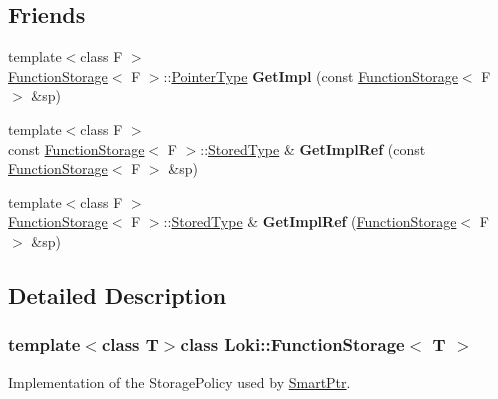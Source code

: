 \subsection*{Friends}
\begin{DoxyCompactItemize}
\item 
\hypertarget{classLoki_1_1FunctionStorage_a3dc5859035d88a940d9aac1499f40f16}{}{\footnotesize template$<$class F $>$ }\\\hyperlink{classLoki_1_1FunctionStorage}{Function\+Storage}$<$ F $>$\+::\hyperlink{classLoki_1_1FunctionStorage_a0e56f22b839615e3082416ca4025ca69}{Pointer\+Type} {\bfseries Get\+Impl} (const \hyperlink{classLoki_1_1FunctionStorage}{Function\+Storage}$<$ F $>$ \&sp)\label{classLoki_1_1FunctionStorage_a3dc5859035d88a940d9aac1499f40f16}

\item 
\hypertarget{classLoki_1_1FunctionStorage_a9fff842b3ebebf29e059ebb4cfeae5c7}{}{\footnotesize template$<$class F $>$ }\\const \hyperlink{classLoki_1_1FunctionStorage}{Function\+Storage}$<$ F $>$\+::\hyperlink{classLoki_1_1FunctionStorage_a52a1fc18d9685e6496bde1078e6949c5}{Stored\+Type} \& {\bfseries Get\+Impl\+Ref} (const \hyperlink{classLoki_1_1FunctionStorage}{Function\+Storage}$<$ F $>$ \&sp)\label{classLoki_1_1FunctionStorage_a9fff842b3ebebf29e059ebb4cfeae5c7}

\item 
\hypertarget{classLoki_1_1FunctionStorage_aca2f0cdd3bc7902fd958661243d76f8b}{}{\footnotesize template$<$class F $>$ }\\\hyperlink{classLoki_1_1FunctionStorage}{Function\+Storage}$<$ F $>$\+::\hyperlink{classLoki_1_1FunctionStorage_a52a1fc18d9685e6496bde1078e6949c5}{Stored\+Type} \& {\bfseries Get\+Impl\+Ref} (\hyperlink{classLoki_1_1FunctionStorage}{Function\+Storage}$<$ F $>$ \&sp)\label{classLoki_1_1FunctionStorage_aca2f0cdd3bc7902fd958661243d76f8b}

\end{DoxyCompactItemize}


\subsection{Detailed Description}
\subsubsection*{template$<$class T$>$class Loki\+::\+Function\+Storage$<$ T $>$}

Implementation of the Storage\+Policy used by \hyperlink{classLoki_1_1SmartPtr}{Smart\+Ptr}. 

